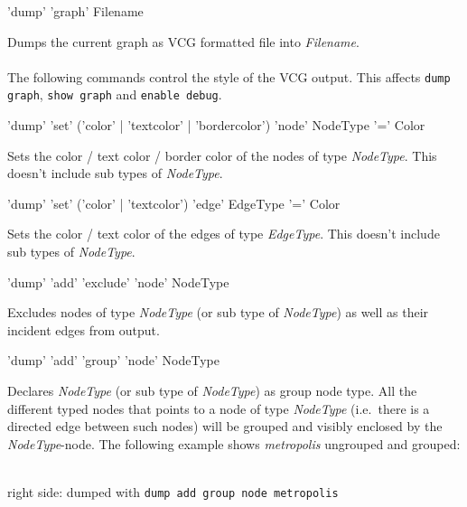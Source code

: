 \begin{rail}
  'dump' 'graph' Filename
\end{rail}
Dumps the current graph as VCG formatted file into \emph{Filename}.\\
\\
The following commands control the style of the VCG output. This affects \texttt{dump graph}, \texttt{show graph} and \texttt{enable debug}. 
\begin{rail}
  'dump' 'set' ('color' | 'textcolor' | 'bordercolor') 'node' NodeType '=' Color
\end{rail}
Sets the color / text color / border color of the nodes of type \emph{NodeType}. This doesn't include sub types of \emph{NodeType}.

\begin{rail}
  'dump' 'set' ('color' | 'textcolor') 'edge' EdgeType '=' Color
\end{rail}
Sets the color / text color of the edges of type \emph{EdgeType}. This doesn't include sub types of \emph{NodeType}.

\begin{rail}
  'dump' 'add' 'exclude' 'node' NodeType
\end{rail}
Excludes nodes of type \emph{NodeType} (or sub type of \emph{NodeType}) as well as their incident edges from output.

\begin{rail}
  'dump' 'add' 'group' 'node' NodeType
\end{rail}
Declares \emph{NodeType} (or sub type of \emph{NodeType}) as group node type. All the different typed nodes that points to a node of type \emph{NodeType} (i.e.\ there is a directed edge between such nodes) will be grouped and visibly enclosed by the \emph{NodeType}-node.
The following example shows \emph{metropolis} ungrouped and grouped:
\begin{center}
    \hfill {}\\
  {\small right side: dumped with \texttt{dump add group node metropolis}}
\end{center}

